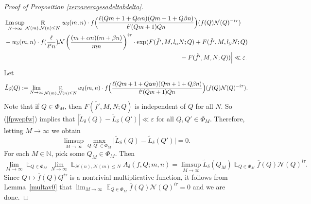 \documentclass[11pt]{amsart}
\theoremstyle{definition}
\DeclareMathOperator*{\E}{\mathbb{E}}
\newcommand{\N}{{\mathbb N}}
\newcommand{\NN}{{\mathcal N}}
\begin{document}
\begin{proof}[Proof of Proposition \ref{zeroaveragesadeltabdelta}]
 \begin{equation}\label{fpwepfw} 
    \begin{split}
       &\limsup_{N\to\infty}\E_{\NN(m), \NN(n) \leq N}  
         \Bigl\vert w_{\delta}(m,n)\cdot f\Bigl(\frac{\ell(Qm+1+Q\alpha n)(Qm+1+Q\beta n)}{\ell'(Qm+1)Qn}\Bigr)(f(Q)\NN(Q)^{-i\tau})
       \\&-w_{\delta}(m,n)\cdot f(\frac{\ell}{\ell'n}) \NN\left(\frac{(m+\alpha n)(m+\beta n)}{mn}\right)^{i\tau} 
       \cdot\exp(F(\tilde{f'},M,l_{\alpha}N;Q)+F(\tilde{f'},M,l_{\beta}N;Q)\\&\quad\quad\quad\quad\quad\quad\quad\quad\quad\quad\quad\quad\quad\quad\quad\quad\quad\quad\quad\quad\quad\quad\quad\quad\quad\quad\quad\quad\; -F(\tilde{f'},M,N;Q))\Bigr\vert\ll\varepsilon. 
    \end{split}
\end{equation}
Let
    $$\tilde{L}_{\delta}(Q):=\lim_{N \to \infty} \E_{\NN(m), \NN(n) \leq N}  w_{\delta}(m,n) \cdot f\Bigl(\frac{\ell(Qm+1+Q\alpha n)(Qm+1+Q\beta n)}{\ell'(Qm+1)Qn}\Bigr)(f(Q)\NN(Q)^{-i\tau}).$$
    Note that if $Q\in\Phi_{M}$, then $F(\tilde{f'},M,N;Q)$ is independent of $Q$ for all $N$. So  (\ref{fpwepfw}) implies that $|\tilde{L}_{\delta}(Q)-\tilde{L}_{\delta}(Q')|\ll \varepsilon$  for all $Q, Q' \in \Phi_M$. 
%
%    
%
%
Therefore, letting $M\to \infty$ we obtain
$$\limsup_{M\to\infty}\max_{Q,Q'\in\Phi_{M}}\vert\tilde{L}_{\delta}(Q)-\tilde{L}_{\delta}(Q')\vert=0.$$
For each $M\in\N$, pick some $Q_{M}\in\Phi_{M}$. Then
$$\lim_{M \to \infty} \E_{Q \in \Phi_M} \lim_{N \to \infty} \E_{\NN(n),\NN(m) \leq N} A_{\delta}(f,Q; m,n)=\limsup_{M\to\infty}\tilde{L}_{\delta}(Q_{M})\E_{Q\in\Phi_M}\overline{f}(Q)\NN(Q)^{i\tau}.$$
Since $Q\mapsto \overline{f}(Q)Q^{i\tau}$ is a nontrivial multiplicative function, it follows from Lemma~\ref{multav0} that $\lim_{M \to \infty} \E_{Q\in\Phi_{M}}\overline{f}(Q)\NN(Q)^{i\tau}=0$ and we are done.

\end{proof}
\end{document}
